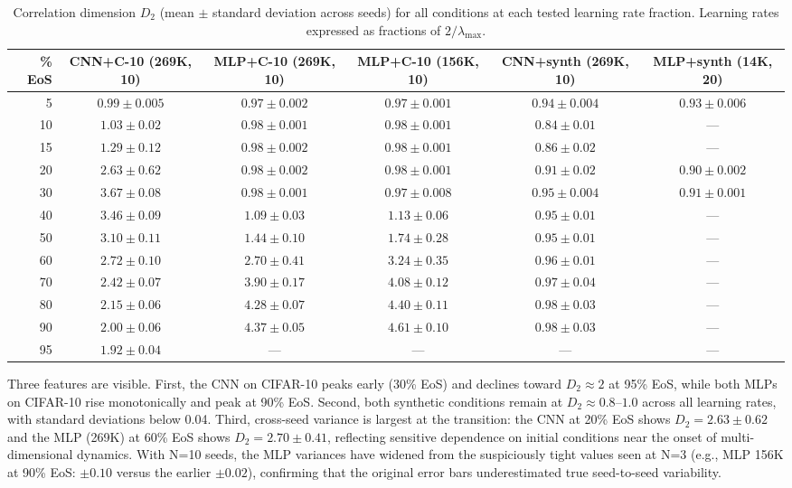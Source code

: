 \documentclass[aps,prl,twocolumn,superscriptaddress,floatfix]{revtex4-2}
\begin{document}
\begin{table}[t]
\caption{\label{tab:d2_all}%
Correlation dimension $D_2$ (mean $\pm$ standard deviation across seeds) for all conditions at each tested learning rate fraction. Learning rates expressed as fractions of $2/\lambda_{\max}$.}
\begin{ruledtabular}
\begin{tabular}{r|ccccc}
\% EoS & CNN+C-10 (269K, 10) & MLP+C-10 (269K, 10) & MLP+C-10 (156K, 10) & CNN+synth (269K, 10) & MLP+synth (14K, 20)\\
\hline
5 & $0.99 \pm 0.005$ & $0.97 \pm 0.002$ & $0.97 \pm 0.001$ & $0.94 \pm 0.004$ & $0.93 \pm 0.006$\\
10 & $1.03 \pm 0.02$ & $0.98 \pm 0.001$ & $0.98 \pm 0.001$ & $0.84 \pm 0.01$ & ---\\
15 & $1.29 \pm 0.12$ & $0.98 \pm 0.002$ & $0.98 \pm 0.001$ & $0.86 \pm 0.02$ & ---\\
20 & $2.63 \pm 0.62$ & $0.98 \pm 0.002$ & $0.98 \pm 0.001$ & $0.91 \pm 0.02$ & $0.90 \pm 0.002$\\
30 & $\mathbf{3.67 \pm 0.08}$ & $0.98 \pm 0.001$ & $0.97 \pm 0.008$ & $0.95 \pm 0.004$ & $0.91 \pm 0.001$\\
40 & $3.46 \pm 0.09$ & $1.09 \pm 0.03$ & $1.13 \pm 0.06$ & $0.95 \pm 0.01$ & ---\\
50 & $3.10 \pm 0.11$ & $1.44 \pm 0.10$ & $1.74 \pm 0.28$ & $0.95 \pm 0.01$ & ---\\
60 & $2.72 \pm 0.10$ & $2.70 \pm 0.41$ & $3.24 \pm 0.35$ & $0.96 \pm 0.01$ & ---\\
70 & $2.42 \pm 0.07$ & $3.90 \pm 0.17$ & $4.08 \pm 0.12$ & $0.97 \pm 0.04$ & ---\\
80 & $2.15 \pm 0.06$ & $4.28 \pm 0.07$ & $4.40 \pm 0.11$ & $0.98 \pm 0.03$ & ---\\
90 & $2.00 \pm 0.06$ & $\mathbf{4.37 \pm 0.05}$ & $\mathbf{4.61 \pm 0.10}$ & $0.98 \pm 0.03$ & ---\\
95 & $1.92 \pm 0.04$ & --- & --- & --- & ---\\
\end{tabular}
\end{ruledtabular}
\end{table}

Three features are visible. First, the CNN on CIFAR-10 peaks early (30\% EoS) and declines toward $D_2 \approx 2$ at 95\% EoS, while both MLPs on CIFAR-10 rise monotonically and peak at 90\% EoS. Second, both synthetic conditions remain at $D_2 \approx 0.8$--$1.0$ across all learning rates, with standard deviations below 0.04. Third, cross-seed variance is largest at the transition: the CNN at 20\% EoS shows $D_2 = 2.63 \pm 0.62$ and the MLP (269K) at 60\% EoS shows $D_2 = 2.70 \pm 0.41$, reflecting sensitive dependence on initial conditions near the onset of multi-dimensional dynamics. With N=10 seeds, the MLP variances have widened from the suspiciously tight values seen at N=3 (e.g., MLP 156K at 90\% EoS: $\pm 0.10$ versus the earlier $\pm 0.02$), confirming that the original error bars underestimated true seed-to-seed variability.
\end{document}
